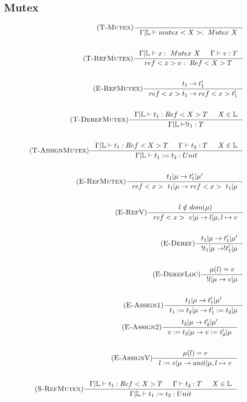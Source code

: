 \documentclass[12pt]{article}
\def\lock {\mathbb{L}}
\begin{document}
\subsection{Mutex}
\begin{align*}
    \tag {\textsc{T-Mutex}}
    \inference[]{
        }{\Gamma|\lock \vdash mutex<X> :~Mutex~X}
    \\
    \\
    \tag {\textsc{T-RefMutex}}
    \inference[]{\Gamma|\lock \vdash x :~Mutex~X & \Gamma \vdash v:T}{ref<x> v:~Ref<X>T}
    \\
    \\
    \tag {\textsc{E-RefMutex}}
    \inference[]{t_1->t_1'}{ref<x> t_1 -> ref<x> t_1'}
    \\
    \\
    \tag {\textsc{T-DerefMutex}}
    \inference[]{\Gamma|\lock \vdash t_1:Ref<X>T & X\in \lock}{\Gamma|\lock\vdash !t_1:T}
    \\
    \\
    \tag {\textsc{T-AssignMutex}}
    \inference[]{\Gamma|\lock \vdash t_1:Ref<X>T & \Gamma \vdash t_2:T & X\in \lock}{\Gamma|\lock\vdash t_1 := t_2:Unit}
    \\
    \\
    \tag {\textsc{E-RefMutex}}
    \inference[]{t_1|\mu->t_1'|\mu '}{ref<x>~t_1|\mu -> ref<x>~t_1|\mu}
    \\
    \\
    \tag {\textsc{E-RefV}}
    \inference[]{l\notin dom(\mu)}{ref<x>~v|\mu -> l|\mu,l\mapsto v}
    \\
    \\
    \tag {\textsc{E-Deref}}
    \inference[]{t_1|\mu->t_1'|\mu '}{!t_1|\mu -> !t_1'|\mu}
    \\
    \\
    \tag {\textsc{E-DerefLoc}}
    \inference[]{\mu(l)=v}{!l|\mu -> v|\mu}
    \\
    \\
    \tag {\textsc{E-Assign1}}
    \inference[]{t_1|\mu->t_1'|\mu '}{t_1:=t_2|\mu -> t_1':=t_2|\mu}
\end{align*}
\begin{align*}
    \tag {\textsc{E-Assign2}}
    \inference[]{t_2|\mu->t_2'|\mu '}{v:=t_2|\mu -> v:=t_2'|\mu}
    \\
    \\
    \tag {\textsc{E-AssignV}}
    \inference[]{\mu(l)=v}{l:=v|\mu -> unit|\mu,l\mapsto v}
    \\
    \\
    \tag {\textsc{S-RefMutex}}
    \inference[]{\Gamma|\lock \vdash t_1:Ref<X>T & \Gamma \vdash t_2:T & X\in \lock}{\Gamma|\lock\vdash t_1 := t_2:Unit}
\end{align*}
\end{document}
